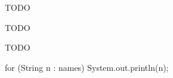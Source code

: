 
TODO




\Q TODO

\begin{answer}
TODO
\end{answer}


for (String n : names) {
    System.out.println(n);
}
